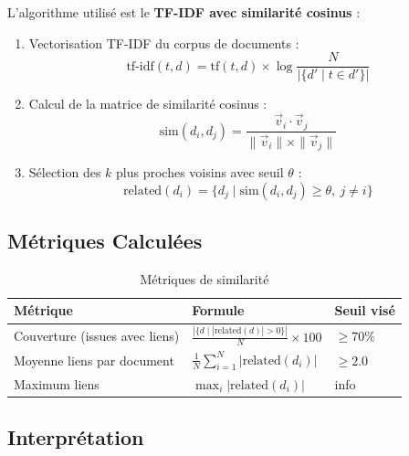 \documentclass[a4paper,12pt]{article}
\begin{document}
L'algorithme utilisé est le \textbf{TF-IDF avec similarité cosinus} :

\begin{enumerate}
    \item Vectorisation TF-IDF du corpus de documents :
    \begin{equation}
        \text{tf-idf}(t, d) = \text{tf}(t,d) \times \log\frac{N}{|\{d' \mid t \in d'\}|}
    \label{eq:tfidf}
    \end{equation}

    \item Calcul de la matrice de similarité cosinus :
    \begin{equation}
        \text{sim}(d_i, d_j) = \frac{\vec{v}_i \cdot \vec{v}_j}{\|\vec{v}_i\| \times \|\vec{v}_j\|}
    \label{eq:cosine}
    \end{equation}

    \item Sélection des $k$ plus proches voisins avec seuil $\theta$ :
    \begin{equation}
        \text{related}(d_i) = \{d_j \mid \text{sim}(d_i, d_j) \geq \theta,\ j \neq i\}
    \label{eq:related}
    \end{equation}
\end{enumerate}

\subsection{Métriques Calculées}

\begin{table}[H]
\centering
\caption{Métriques de similarité}
\label{tab:similarity}
\begin{tabular}{>{\raggedright}p{5.5cm} p{5.5cm} p{3cm}}
\toprule
\textbf{Métrique} & \textbf{Formule} & \textbf{Seuil visé} \\
\midrule
Couverture (issues avec liens) & $\displaystyle \frac{|\{d \mid |\text{related}(d)| > 0\}|}{N} \times 100$ & $\geq 70\%$ \\[12pt]
Moyenne liens par document & $\displaystyle \frac{1}{N}\sum_{i=1}^{N} |\text{related}(d_i)|$ & $\geq 2.0$ \\[12pt]
Maximum liens & $\displaystyle \max_i |\text{related}(d_i)|$ & info \\
\bottomrule
\end{tabular}
\end{table}

\subsection{Interprétation}
\end{document}
